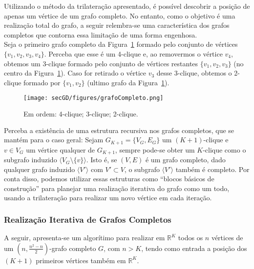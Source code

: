 Utilizando o método da trilateração apresentado, é possível descobrir a posição de apenas um vértice de um grafo completo. No entanto, como o objetivo é uma realização total do grafo, a seguir relembra-se uma característica dos grafos completos que contorna essa limitação de uma forma engenhosa.
\\

Seja o primeiro grafo completo da Figura~\ref{fig:grafoCompleto} formado pelo conjunto de vértices $\{v_1,v_2,v_3,v_4\}$. Perceba que esse é um 4-clique e, ao removermos o vértice $v_4$, obtemos um $3$-clique formado pelo conjunto de vértices restantes $\{v_1,v_2,v_3\}$ (no centro da Figura~\ref{fig:grafoCompleto}). Caso for retirado o vértice $v_3$ desse 3-clique, obtemos o 2-clique formado por $\{v_1, v_2\}$ (ultimo grafo da Figura~\ref{fig:grafoCompleto}). 

\begin{figure}[H]
	\begin{center}
		\texttt{[image: secGD/figures/grafoCompleto.png]}
	\end{center}
	\caption{Em ordem: 4-clique; 3-clique; 2-clique.}
	\label{fig:grafoCompleto}
\end{figure}

Perceba a existência de uma estrutura recursiva nos grafos completos, que se mantém para o caso geral: Sejam $G_{K+1} = \{V_G, E_G\}$ um $(K+1)$-clique e $v \in V_G$ um vértice qualquer de $G_{K+1}$, sempre pode-se obter um $K$-clique como o subgrafo induzido $\langle V_G \setminus \{v\}\rangle$. Isto é, se $(V,E)$ é um grafo completo, dado qualquer grafo induzido $\langle V'\rangle$ com $V'\subset V$, o subgrafo $\langle V' \rangle$ também é completo. Por conta disso, podemos utilizar essas estruturas como ``blocos básicos de construção'' para planejar uma realização iterativa do grafo como um todo, usando a trilateração para realizar um novo vértice em cada iteração. 




\subsubsection{Realização Iterativa de Grafos Completos}

A seguir, apresenta-se um algorítimo para realizar em $\mathbb{R}^K$ todos os $n$ vértices de um $(n,\frac{n^2 -n}{2})$-grafo completo $G$, com $n > K$, tendo como entrada a posição dos $(K+1)$ primeiros vértices também em $\mathbb{R}^{K}$.
\\

